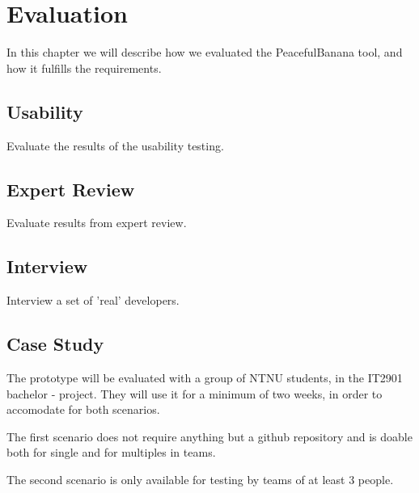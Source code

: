 \chapter{Evaluation}
In this chapter we will describe how we evaluated the PeacefulBanana tool, and how it fulfills the requirements.



\section{Usability}
Evaluate the results of the usability testing. 

\section{Expert Review}
Evaluate results from expert review. %

\section{Interview}
Interview a set of 'real' developers.

\section{Case Study}
The prototype will be evaluated with a group of NTNU students, in the IT2901 bachelor - project. They will use it for a minimum of two weeks, in order to accomodate for both scenarios.

The first scenario does not require anything but a github repository and is doable both for single and for multiples in teams.

The second scenario is only available for testing by teams of at least 3 people.